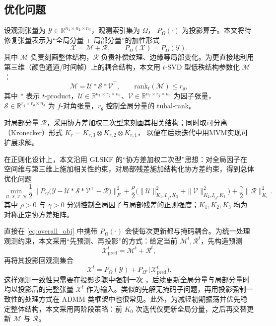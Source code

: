 \documentclass[UTF8]{ctexart}
\begin{document}
\subsection{ 优化问题}
设观测张量为 $\mathcal{Y}\in\mathbb{R}^{n_1\times n_2\times n_3}$，观测索引集为 $\Omega$， $P_{\Omega}(\cdot)$ 为投影算子。本文将待修复张量表示为“全局分量 + 局部分量”的加性形式
\begin{equation}
\mathcal{X}=\mathcal{M}+\mathcal{R},\qquad P_{\Omega}(\mathcal{X})=P_{\Omega}(\mathcal{Y}).
\label{eq:add_model}
\end{equation}
其中 $\mathcal{M}$ 负责刻画整体结构，$\mathcal{R}$ 负责补偿纹理、边缘等局部变化。为更直接地利用第三维（颜色通道/时间帧）上的耦合结构，本文用 $t$-SVD 型低秩结构参数化 $\mathcal{M}$：
\begin{equation}
\mathcal{M}=\mathcal{U}*\mathcal{S}*\mathcal{V}^{\top},\qquad \mathrm{rank}_t(\mathcal{M})\le r_g,
\label{eq:global_tsvd}
\end{equation}
其中 $*$ 表示 $t$-product，$\mathcal{U}\in\mathbb{R}^{n_1\times r_g\times n_3}$、$\mathcal{V}\in\mathbb{R}^{n_2\times r_g\times n_3}$ 为因子张量，$\mathcal{S}\in\mathbb{R}^{r_g\times r_g\times n_3}$ 为 $f$-对角张量，$r_g$ 控制全局分量的 tubal-rank\cite{kilmer2011factorization,zhang2017tsvd}。

对局部分量 $\mathcal{R}$，采用协方差加权二次型来刻画其相关结构；同时取可分离（Kronecker）形式
$K_r = K_{r,3}\otimes K_{r,2}\otimes K_{r,1}$，
以便在后续迭代中用MVM实现可扩展求解\cite{lei2024glskf,allen2014glsmd}。

在正则化设计上，本文沿用 GLSKF 的“协方差加权二次型”思想：对全局因子在空间维与第三维上施加相关性约束，对局部残差施加结构化协方差约束，得到总体优化问题
\begin{equation}
\min_{\mathcal{U},\mathcal{S},\mathcal{V},\mathcal{R}}
\frac{1}{2}\Big\|P_{\Omega}\big(\mathcal{Y}-\mathcal{U}*\mathcal{S}*\mathcal{V}^{\top}-\mathcal{R}\big)\Big\|_{F}^{2}
+\frac{\rho}{2}\Big(\|\mathcal{U}\|^{2}_{K_1,I_{r_g},K_3}+\|\mathcal{V}\|^{2}_{K_2,I_{r_g},K_3}\Big)
+\frac{\gamma}{2}\|\mathcal{R}\|^{2}_{K_r}.
\label{eq:overall_obj}
\end{equation}
其中 $\rho>0$ 与 $\gamma>0$ 分别控制全局因子与局部残差的正则强度；$K_1,K_2,K_3$ 均为对称正定协方差矩阵。

直接在 \eqref{eq:overall_obj} 中携带 $P_{\Omega}(\cdot)$ 会使每次更新都与掩码耦合。为统一处理观测约束，本文采用“先预测、再投影”的方式：给定当前 $\mathcal{M}^t,\mathcal{R}^t$，先构造预测
\begin{equation}
\mathcal{X}_{\mathrm{pred}}^{t}=\mathcal{M}^{t}+\mathcal{R}^{t},
\label{eq:xpred}
\end{equation}
再将其投影回观测集合
\begin{equation}
\mathcal{X}^{t}=P_{\Omega}(\mathcal{Y})+P_{\Omega^{c}}\big(\mathcal{X}_{\mathrm{pred}}^{t}\big).
\label{eq:proj}
\end{equation}
这样观测一致性只需要在投影步骤中强制一次 ，后续更新全局分量与局部分量时均以投影后的完整张量 $\mathcal{X}^{t}$ 作为输入。类似的先解无掩码子问题，再用投影强制一致性的处理方式在 ADMM 类框架中也很常见\cite{boyd2011admm}。此外，为减轻初期振荡并优先稳定整体结构，本文采用两阶段策略：前 $K_0$ 次迭代仅更新全局分量，之后再交替更新 $\mathcal{M}$ 与 $\mathcal{R}$。
\end{document}
